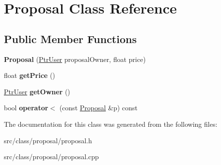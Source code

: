 \hypertarget{class_proposal}{}\section{Proposal Class Reference}
\label{class_proposal}
\subsection*{Public Member Functions}
\begin{DoxyCompactItemize}
\item 
\hypertarget{class_proposal_a0ef8a1a8f940068adc8ffaeaa506ebf1}{}{\bfseries Proposal} (\hyperlink{class_ptr_user}{Ptr\+User} proposal\+Owner, float price)\label{class_proposal_a0ef8a1a8f940068adc8ffaeaa506ebf1}

\item 
\hypertarget{class_proposal_a465b08ee975ff1d89aede6bee0d16608}{}float {\bfseries get\+Price} ()\label{class_proposal_a465b08ee975ff1d89aede6bee0d16608}

\item 
\hypertarget{class_proposal_a76f1b22a8e5f2cd1accf39fc6ca8f222}{}\hyperlink{class_ptr_user}{Ptr\+User} {\bfseries get\+Owner} ()\label{class_proposal_a76f1b22a8e5f2cd1accf39fc6ca8f222}

\item 
\hypertarget{class_proposal_ab49f3b0c457f77190b7b6199b0df93ec}{}bool {\bfseries operator$<$} (const \hyperlink{class_proposal}{Proposal} \&p) const \label{class_proposal_ab49f3b0c457f77190b7b6199b0df93ec}

\end{DoxyCompactItemize}


The documentation for this class was generated from the following files\+:\begin{DoxyCompactItemize}
\item 
src/class/proposal/proposal.\+h\item 
src/class/proposal/proposal.\+cpp\end{DoxyCompactItemize}
